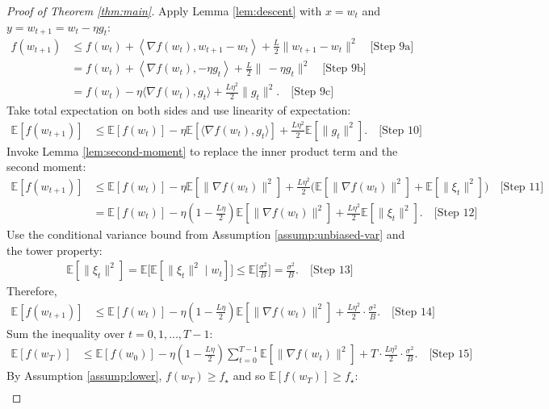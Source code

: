 \documentclass[11pt]{article}
\newcommand{\E}{\mathbb{E}}
\begin{document}
\begin{proof}[Proof of Theorem \ref{thm:main}]
Apply Lemma \ref{lem:descent} with $x=w_t$ and $y=w_{t+1}=w_t-\eta g_t$:
\begin{align*}
f(w_{t+1})
&\le f(w_t) + \left\langle \nabla f(w_t), w_{t+1}-w_t\right\rangle + \frac{L}{2}\|w_{t+1}-w_t\|^2 \quad \text{[Step 9a]}\\
&= f(w_t) + \left\langle \nabla f(w_t), -\eta g_t\right\rangle + \frac{L}{2}\|\,-\eta g_t\|^2 \quad \text{[Step 9b]}\\
&= f(w_t) - \eta \langle \nabla f(w_t), g_t\rangle + \frac{L\eta^2}{2}\|g_t\|^2. \quad \text{[Step 9c]}
\end{align*}
Take total expectation on both sides and use linearity of expectation:
\begin{align*}
\E[f(w_{t+1})]
&\le \E[f(w_t)] - \eta \E[\langle \nabla f(w_t), g_t\rangle] + \frac{L\eta^2}{2}\E[\|g_t\|^2]. \quad \text{[Step 10]}
\end{align*}
Invoke Lemma \ref{lem:second-moment} to replace the inner product term and the second moment:
\begin{align*}
\E[f(w_{t+1})]
&\le \E[f(w_t)] - \eta \E[\|\nabla f(w_t)\|^2] + \frac{L\eta^2}{2}\Big(\E[\|\nabla f(w_t)\|^2] + \E[\|\xi_t\|^2]\Big) \quad \text{[Step 11]}\\
&= \E[f(w_t)] - \eta\!\left(1-\frac{L\eta}{2}\right)\!\E[\|\nabla f(w_t)\|^2] + \frac{L\eta^2}{2}\E[\|\xi_t\|^2]. \quad \text{[Step 12]}
\end{align*}
Use the conditional variance bound from Assumption \ref{assump:unbiased-var} and the tower property:
\begin{align*}
\E[\|\xi_t\|^2] = \E\big[\E[\|\xi_t\|^2\mid w_t]\big] \le \E\Big[\frac{\sigma^2}{B}\Big] = \frac{\sigma^2}{B}. \quad \text{[Step 13]}
\end{align*}
Therefore,
\begin{align*}
\E[f(w_{t+1})]
&\le \E[f(w_t)] - \eta\!\left(1-\frac{L\eta}{2}\right)\!\E[\|\nabla f(w_t)\|^2] + \frac{L\eta^2}{2}\cdot \frac{\sigma^2}{B}. \quad \text{[Step 14]}
\end{align*}
Sum the inequality over $t=0,1,\dots,T-1$:
\begin{align*}
\E[f(w_T)]
&\le \E[f(w_0)] - \eta\!\left(1-\frac{L\eta}{2}\right)\!\sum_{t=0}^{T-1}\E[\|\nabla f(w_t)\|^2] + T\cdot \frac{L\eta^2}{2}\cdot \frac{\sigma^2}{B}. \quad \text{[Step 15]}
\end{align*}
By Assumption \ref{assump:lower}, $f(w_T)\ge f_\star$ and so $\E[f(w_T)]\ge f_\star$:
\begin{align*}

\end{align*}
\end{proof}
\end{document}
